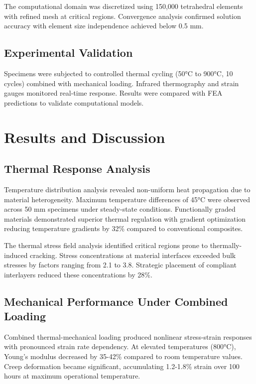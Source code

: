 \documentclass[10pt,conference]{IEEEtran}
\begin{document}
The computational domain was discretized using 150,000 tetrahedral elements with refined mesh at critical regions. Convergence analysis confirmed solution accuracy with element size independence achieved below 0.5 mm.

\subsection{Experimental Validation}

Specimens were subjected to controlled thermal cycling (50°C to 900°C, 10 cycles) combined with mechanical loading. Infrared thermography and strain gauges monitored real-time response. Results were compared with FEA predictions to validate computational models.

\section{Results and Discussion}

\subsection{Thermal Response Analysis}

Temperature distribution analysis revealed non-uniform heat propagation due to material heterogeneity. Maximum temperature differences of 45°C were observed across 50 mm specimens under steady-state conditions. Functionally graded materials demonstrated superior thermal regulation with gradient optimization reducing temperature gradients by 32\% compared to conventional composites.

The thermal stress field analysis identified critical regions prone to thermally-induced cracking. Stress concentrations at material interfaces exceeded bulk stresses by factors ranging from 2.1 to 3.8. Strategic placement of compliant interlayers reduced these concentrations by 28\%.

\subsection{Mechanical Performance Under Combined Loading}

Combined thermal-mechanical loading produced nonlinear stress-strain responses with pronounced strain rate dependency. At elevated temperatures (800°C), Young's modulus decreased by 35-42\% compared to room temperature values. Creep deformation became significant, accumulating 1.2-1.8\% strain over 100 hours at maximum operational temperature.
\end{document}
